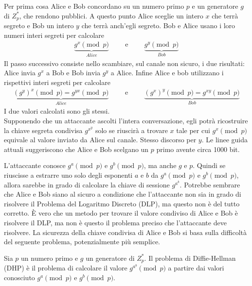 Per prima cosa Alice e Bob concordano su un numero primo $p$ e un generatore $g$ di $Z_p^*$, che rendono pubblici. 
A questo punto Alice sceglie un intero $x$ che terrà segreto e Bob un intero $y$ che terrà anch'egli segreto. Bob e Alice usano i loro numeri interi segreti per calcolare
\begin{align*}
     	\underbrace{g^x \pmod{p}}_{Alice} \hspace{1cm}\text{e}\hspace{1cm} \underbrace{g^y \pmod{p}}_{Bob}
\end{align*}
\noindent Il passo successivo consiste nello scambiare, sul canale non sicuro, i due risultati: Alice invia $g^x$ a Bob e Bob invia $g^y$ a Alice. Infine Alice e bob utilizzano i rispettivi interi segreti per calcolare
\begin{align*}
     	\underbrace{(g^y)^x \pmod{p} = g^{yx} \pmod{p}}_{Alice} \hspace{1cm}\text{e}\hspace{1cm} \underbrace{(g^x)^y \pmod{p} = g^{xy} \pmod{p}}_{Bob}
\end{align*}
\noindent I due valori calcolati sono gli stessi.\\

\noindent Supponendo che un attaccante ascolti l'intera conversazione, egli potrà ricostruire la chiave segreta condivisa $g^x^y$ solo se riuscirà a trovare $x$ tale per cui $g^x \pmod p$ equivale al valore inviato da Alice sul canale. Stesso discorso per $y$. Le linee guida attuali suggeriscono che Alice e Bob scelgano un $p$ primo avente circa 1000 bit.

L'attaccante conosce $g^a \pmod{p}$ e $g^b \pmod{p}$, ma anche $g$ e $p$. Quindi se riuscisse a estrarre uno solo degli esponenti $a$ e $b$ da $g^a \pmod{p}$ e $g^b \pmod{p}$, allora sarebbe in grado di calcolare la chiave di sessione $g^a^b$. Potrebbe sembrare che Alice e Bob siano al sicuro a condizione che l'attaccante non sia in grado di risolvere il Problema del Logaritmo Discreto (DLP), ma questo non è del tutto corretto. È vero che un metodo per trovare il valore condiviso di Alice e Bob è risolvere il DLP, ma non è questo il problema preciso che l'attaccante deve risolvere. La sicurezza della chiave condivisa di Alice e Bob si basa sulla difficoltà del seguente problema, potenzialmente più semplice.

\begin{definition}
Sia \(p\) un numero primo e \(g\) un generatore di \(Z_p^*\). Il problema di Diffie-Hellman (DHP) è il problema di calcolare il valore \(g^a^b \pmod p\) a partire dai valori conosciuto \(g^a \pmod p\) e \(g^b \pmod p\).
\end{definition}

